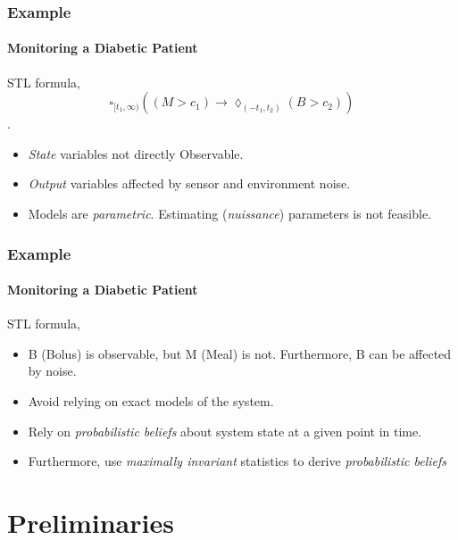 \documentclass{beamer}
\newcommand{\always}[1]{\square_{#1}}
\newcommand{\eventually}[1]{\lozenge_{#1}}
\begin{document}
\begin{frame}
    \frametitle{Example}
    \framesubtitle{Monitoring a Diabetic Patient}

    STL formula, 
        $$ \always{ [ t_1, \infty )}
    \left( \left (M > c_1 \right ) \to \eventually{\left(-t_1, t_2 \right)}
    \left( B > c_2 \right ) \right)$$.
    \pause
    \begin{itemize}
        \item \textit{State} variables not directly Observable.
        \item \textit{Output} variables affected by sensor and environment noise.
        \item Models are \textit{parametric}. Estimating (\textit{nuissance}) parameters is not
            feasible.
    \end{itemize}
\end{frame}
\begin{frame}
    \frametitle{Example}
    \framesubtitle{Monitoring a Diabetic Patient}

    STL formula, 
    \begin{itemize}
        \item B (Bolus) is observable, but M (Meal) is not. Furthermore, B
            can be affected by noise.
        \pause
        \item Avoid relying on exact models of the system.
        \item Rely on \textit{probabilistic beliefs} about
            system state at a given point in time.
        \pause
        \item Furthermore, use \textit{maximally invariant} statistics
            to derive \textit{probabilistic beliefs}
    \end{itemize}
\end{frame}

\section{Preliminaries}
\end{document}
